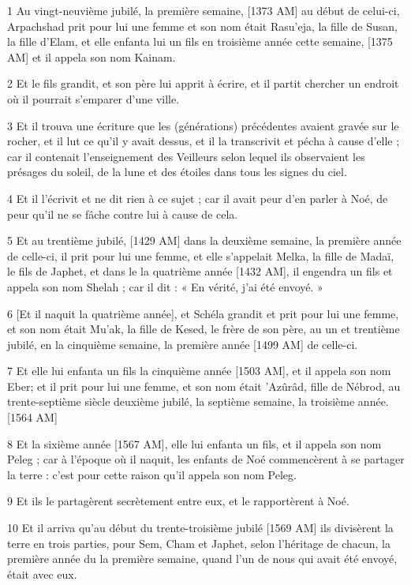 \par 1 Au vingt-neuvième jubilé, la première semaine, [1373 AM] au début de celui-ci, Arpachshad prit pour lui une femme et son nom était Rasu'eja, la fille de Susan, la fille d'Elam, et elle enfanta lui un fils en troisième année cette semaine, [1375 AM] et il appela son nom Kainam.
\par 2 Et le fils grandit, et son père lui apprit à écrire, et il partit chercher un endroit où il pourrait s'emparer d'une ville.
\par 3 Et il trouva une écriture que les (générations) précédentes avaient gravée sur le rocher, et il lut ce qu'il y avait dessus, et il la transcrivit et pécha à cause d'elle ; car il contenait l'enseignement des Veilleurs selon lequel ils observaient les présages du soleil, de la lune et des étoiles dans tous les signes du ciel.
\par 4 Et il l'écrivit et ne dit rien à ce sujet ; car il avait peur d'en parler à Noé, de peur qu'il ne se fâche contre lui à cause de cela.
\par 5 Et au trentième jubilé, [1429 AM] dans la deuxième semaine, la première année de celle-ci, il prit pour lui une femme, et elle s'appelait Melka, la fille de Madaï, le fils de Japhet, et dans le la quatrième année [1432 AM], il engendra un fils et appela son nom Shelah ; car il dit : « En vérité, j'ai été envoyé. »
\par 6 [Et il naquit la quatrième année], et Schéla grandit et prit pour lui une femme, et son nom était Mu'ak, la fille de Kesed, le frère de son père, au un et trentième jubilé, en la cinquième semaine, la première année [1499 AM] de celle-ci.
\par 7 Et elle lui enfanta un fils la cinquième année [1503 AM], et il appela son nom Eber; et il prit pour lui une femme, et son nom était 'Azûrâd, fille de Nébrod, au trente-septième siècle deuxième jubilé, la septième semaine, la troisième année. [1564 AM]
\par 8 Et la sixième année [1567 AM], elle lui enfanta un fils, et il appela son nom Peleg ; car à l'époque où il naquit, les enfants de Noé commencèrent à se partager la terre : c'est pour cette raison qu'il appela son nom Peleg.
\par 9 Et ils le partagèrent secrètement entre eux, et le rapportèrent à Noé.
\par 10 Et il arriva qu'au début du trente-troisième jubilé [1569 AM] ils divisèrent la terre en trois parties, pour Sem, Cham et Japhet, selon l'héritage de chacun, la première année du la première semaine, quand l'un de nous qui avait été envoyé, était avec eux.
